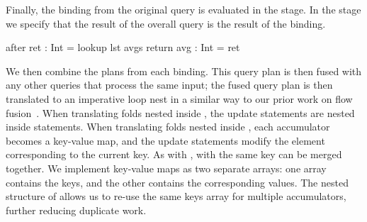 Finally, the \IcC@ret@ binding from the original query is evaluated in the \IcC@after@ stage. In the \IcC@return@ stage we specify that the result of the overall query \IcC@avg@ is the result of the \IcC@ret@ binding.
\begin{icicle-core}
  after  { ret : Int = lookup lst avgs }
  return { avg : Int = ret }
\end{icicle-core}


We then combine the plans from each binding.
This query plan is then fused with any other queries that process the same input; the fused query plan is then translated to an imperative loop nest in a similar way to our prior work on flow fusion~\cite{lippmeier2013data}.
When translating folds nested inside \IcC@filter@s, the update statements are nested inside \IcC@if@ statements.
When translating folds nested inside \IcC@group@s, each accumulator becomes a key-value map, and the update statements modify the element corresponding to the current key.
As with \IcC@filter@s, \IcC@group@s with the same key can be merged together.
We implement key-value maps as two separate arrays: one array contains the keys, and the other contains the corresponding values.
The nested structure of \IcC@group@s allows us to re-use the same keys array for multiple accumulators, further reducing duplicate work.

